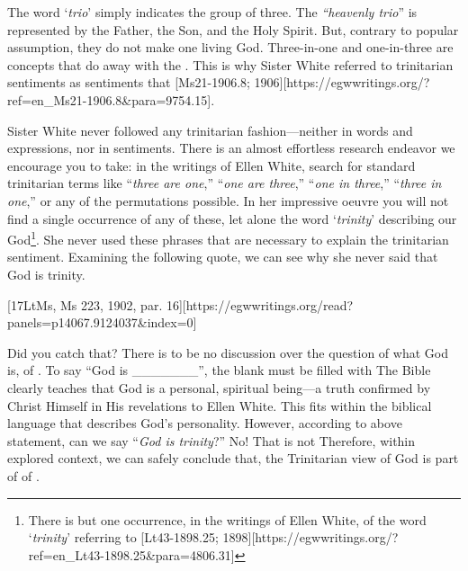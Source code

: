 The word ‘\textit{trio}’ simply indicates the group of three. The \textit{“heavenly trio}” is represented by the Father, the Son, and the Holy Spirit. But, contrary to popular assumption, they do not make one living God. Three-in-one and one-in-three are concepts that do away with the . This is why Sister White referred to trinitarian sentiments as sentiments that [Ms21-1906.8; 1906][https://egwwritings.org/?ref=en\_Ms21-1906.8&para=9754.15].

Sister White never followed any trinitarian fashion—neither in words and expressions, nor in sentiments. There is an almost effortless research endeavor we encourage you to take: in the writings of Ellen White, search for standard trinitarian terms like “\textit{three are one},” “\textit{one are three},” “\textit{one in three},” “\textit{three in one},” or any of the permutations possible. In her impressive oeuvre you will not find a single occurrence of any of these, let alone the word ‘\textit{trinity}’ describing our God\footnote{There is but one occurrence, in the writings of Ellen White, of the word ‘\textit{trinity}’ referring to [Lt43-1898.25; 1898][https://egwwritings.org/?ref=en\_Lt43-1898.25&para=4806.31]}. She never used these phrases that are necessary to explain the trinitarian sentiment. Examining the following quote, we can see why she never said that God is trinity.

[17LtMs, Ms 223, 1902, par. 16][https://egwwritings.org/read?panels=p14067.9124037&index=0]

Did you catch that? There is to be no discussion over the question of what God is,  of . To say “God is \_\_\_\_\_\_\_”, the blank must be filled with  The Bible clearly teaches that God is a personal, spiritual being—a truth confirmed by Christ Himself in His revelations to Ellen White. This fits within the biblical language that describes God’s personality. However, according to above statement, can we say “\textit{God is trinity}?” No! That is not  Therefore, within explored context, we can safely conclude that, the Trinitarian view of God is part of  of .

